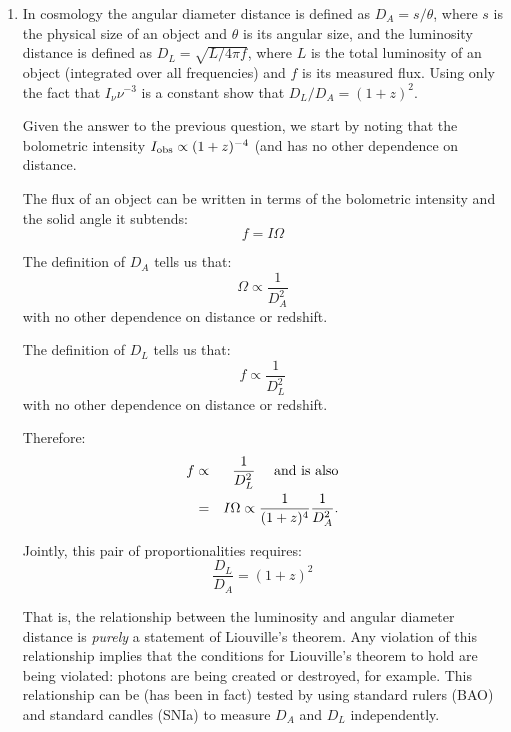 \documentclass[11pt, preprint]{article}
\begin{document}
\begin{enumerate}
\item In cosmology the angular diameter distance is defined as $D_A =
  s / \theta$, where $s$ is the physical size of an object and
  $\theta$ is its angular size, and the luminosity distance is defined
  as $D_L = \sqrt{L/4\pi f}$, where $L$ is the total luminosity of an
  object (integrated over all frequencies) and $f$ is its measured
  flux. Using only the fact that $I_\nu \nu^{-3}$ is a constant show
  that $D_L/D_A = (1+z)^2$.

  \begin{answer}
    Given the answer to the previous question, we start by noting that
    the bolometric intensity $I_{\rm obs} \propto (1+z)^{-4}$ (and has no
    other dependence on distance.

    The flux of an object can be written in terms of the bolometric
    intensity and the solid angle it subtends:
    \begin{equation}
     f = I \Omega
    \end{equation}

    The definition of $D_A$ tells us that:
    \begin{equation}
      \Omega \propto \frac{1}{D_A^2}
    \end{equation}
    with no other dependence on distance or redshift.

    The definition of $D_L$ tells us that:
    \begin{equation}
      f \propto \frac{1}{D_L^2}
    \end{equation}
    with no other dependence on distance or redshift.

    Therefore:
    \begin{eqnarray}
      f &\propto& \frac{1}{D_L^2} \quad{\rm ~and~is~also}\cr
      &=& I \Omega \propto \frac{1}{(1+z)^4} \frac{1}{D_A^2}.
    \end{eqnarray}

    Jointly, this pair of proportionalities requires:
    \begin{equation}
      \frac{D_L}{D_A} = (1+z)^2
    \end{equation}

    That is, the relationship between the luminosity and angular
    diameter distance is {\it purely} a statement of Liouville's
    theorem. Any violation of this relationship implies that the
    conditions for Liouville's theorem to hold are being violated:
    photons are being created or destroyed, for example. This
    relationship can be (has been in fact) tested by using standard
    rulers (BAO) and standard candles (SNIa) to measure $D_A$ and
    $D_L$ independently. 
  \end{answer}
\end{enumerate}
\end{document}
